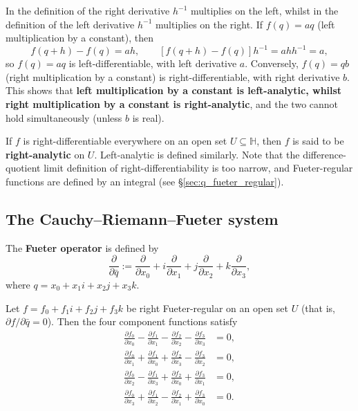 \begin{remark}\label{rem:q_derivative_difference}
In the definition of the right derivative $h^{-1}$ multiplies on the left, whilst in the definition of the left derivative $h^{-1}$ multiplies on the right. If $f(q)=aq$ (left multiplication by a constant), then
\[
f(q+h)-f(q)=a h,\qquad [f(q+h)-f(q)]h^{-1}=a h h^{-1}=a,
\]
so $f(q)=aq$ is left-differentiable, with left derivative $a$. Conversely, $f(q)=qb$ (right multiplication by a constant) is right-differentiable, with right derivative $b$. This shows that \textbf{left multiplication by a constant is left-analytic, whilst right multiplication by a constant is right-analytic}, and the two cannot hold simultaneously (unless $b$ is real).
\end{remark}

\begin{definition}\label{def:q_analytic}
If $f$ is right-differentiable everywhere on an open set $U\subseteq\mathbb{H}$, then $f$ is said to be \textbf{right-analytic} on $U$. Left-analytic is defined similarly. Note that the difference-quotient limit definition of right-differentiability is too narrow, and Fueter-regular functions are defined by an integral (see \S\ref{sec:q_fueter_regular}).
\end{definition}

\subsection{The Cauchy--Riemann--Fueter system}

\begin{definition}\label{def:q_fueter_operator}
The \textbf{Fueter operator} is defined by
\[
\frac{\partial}{\partial \bar q}:=
\frac{\partial}{\partial x_0}
+i\frac{\partial}{\partial x_1}
+j\frac{\partial}{\partial x_2}
+k\frac{\partial}{\partial x_3},
\]
where $q=x_0+x_1i+x_2j+x_3k$.
\end{definition}

\begin{theorem}\label{thm:q_crf}
Let $f=f_0+f_1i+f_2j+f_3k$ be right Fueter-regular on an open set $U$ (that is, $\partial f/\partial \bar q=0$). Then the four component functions satisfy
\[
\begin{aligned}
\frac{\partial f_0}{\partial x_0}
-\frac{\partial f_1}{\partial x_1}
-\frac{\partial f_2}{\partial x_2}
-\frac{\partial f_3}{\partial x_3}&=0,\\[2pt]
\frac{\partial f_0}{\partial x_1}
+\frac{\partial f_1}{\partial x_0}
+\frac{\partial f_2}{\partial x_3}
-\frac{\partial f_3}{\partial x_2}&=0,\\[2pt]
\frac{\partial f_0}{\partial x_2}
-\frac{\partial f_1}{\partial x_3}
+\frac{\partial f_2}{\partial x_0}
+\frac{\partial f_3}{\partial x_1}&=0,\\[2pt]
\frac{\partial f_0}{\partial x_3}
+\frac{\partial f_1}{\partial x_2}
-\frac{\partial f_2}{\partial x_1}
+\frac{\partial f_3}{\partial x_0}&=0.
\end{aligned}
\]
\end{theorem}

